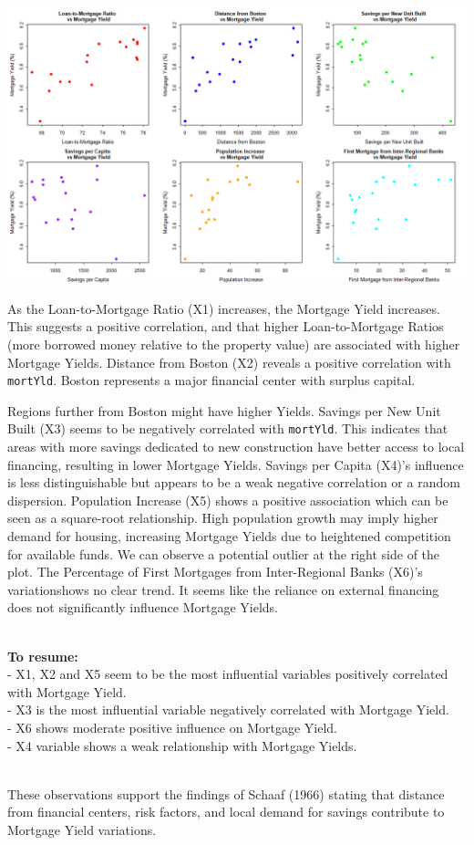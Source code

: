 \documentclass[
  11pt,
]{article}
\begin{document}
\begin{minipage}{0.5\textwidth}
\includegraphics[width=1.5\linewidth]{6plots_summary.png}
\end{minipage}
\hfill
\begin{minipage}{0.25\textwidth}
\small
As the Loan-to-Mortgage Ratio (X1) increases, the Mortgage Yield increases. This suggests a positive correlation, and that higher Loan-to-Mortgage Ratios (more borrowed money relative to the property value) are associated with higher Mortgage Yields. Distance from Boston (X2) reveals a positive correlation with \texttt{mortYld}. Boston represents a major financial center with surplus capital.
\end{minipage}

Regions further from Boston might have higher Yields. Savings per New
Unit Built (X3) seems to be negatively correlated with \texttt{mortYld}.
This indicates that areas with more savings dedicated to new
construction have better access to local financing, resulting in lower
Mortgage Yields. Savings per Capita (X4)'s influence is less
distinguishable but appears to be a weak negative correlation or a
random dispersion. Population Increase (X5) shows a positive association
which can be seen as a square-root relationship. High population growth
may imply higher demand for housing, increasing Mortgage Yields due to
heightened competition for available funds. We can observe a potential
outlier at the right side of the plot. The Percentage of First Mortgages
from Inter-Regional Banks (X6)'s variationshows no clear trend. It seems
like the reliance on external financing does not significantly influence
Mortgage Yields.\\
\strut \\
\textbf{To resume:}\\
- X1, X2 and X5 seem to be the most influential variables positively
correlated with Mortgage Yield.\\
- X3 is the most influential variable negatively correlated with
Mortgage Yield.\\
- X6 shows moderate positive influence on Mortgage Yield.\\
- X4 variable shows a weak relationship with Mortgage Yields.\\
\strut \\
These observations support the findings of Schaaf (1966) stating that
distance from financial centers, risk factors, and local demand for
savings contribute to Mortgage Yield variations.
\end{document}
